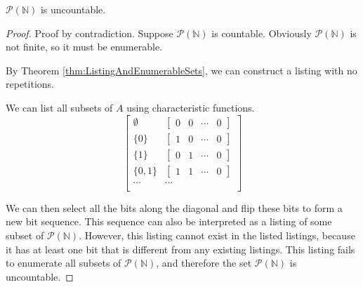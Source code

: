 \begin{theorem}
    \label{thm:CantorsTheorem}
    $\mathcal{P}(\mathbb{N})$ is uncountable.
\end{theorem}
\begin{proof}
    Proof by contradiction. Suppose $\mathcal{P}(\mathbb{N})$ is countable. Obviously $\mathcal{P}(\mathbb{N})$ is not finite, so it must be enumerable.

    By Theorem \ref{thm:ListingAndEnumerableSets}, we can construct a listing with no repetitions.

    We can list all subsets of $A$ using characteristic functions.
    \[\begin{bmatrix}
        \emptyset & \begin{bmatrix} 0 & 0 & \cdots & 0 \end{bmatrix}\\
        \{0\} & \begin{bmatrix} 1 & 0 & \cdots & 0 \end{bmatrix}\\
        \{1\} & \begin{bmatrix} 0 & 1 & \cdots & 0 \end{bmatrix}\\
        \{0, 1\} & \begin{bmatrix} 1 & 1 & \cdots & 0 \end{bmatrix}\\
        \cdots & \cdots\\
    \end{bmatrix}\]

    We can then select all the bits along the diagonal and flip these bits to form a new bit sequence. This sequence can also be interpreted as a listing of some subset of $\mathcal{P}(\mathbb{N})$. However, this listing cannot exist in the listed listings, because it has at least one bit that is different from any existing listings. This listing fails to enumerate all subsets of $\mathcal{P}(\mathbb{N})$, and therefore the set $\mathcal{P}(\mathbb{N})$ is uncountable.
\end{proof}
